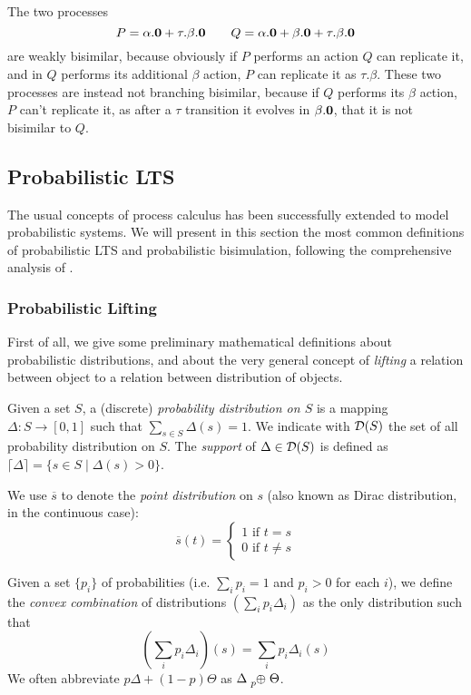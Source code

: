 The two processes \[P = \alpha.\mathbf{0} + \tau.\beta.\mathbf{0} \qquad Q = \alpha.\mathbf{0} + \beta.\mathbf{0} + \tau.\beta.\mathbf{0}\] are weakly bisimilar, because obviously if $P$ performs an action $Q$ can replicate it, and in $Q$ performs its additional $\beta$ action, $P$ can replicate it as $\tau.\beta$. These two processes are instead not branching bisimilar, because if $Q$ performs its $\beta$ action, $P$ can't replicate it, as after a $\tau$ transition it evolves in $\beta.\mathbf{0}$, that it is not bisimilar to $Q$.

\subsection{Probabilistic LTS} \label{pLTS}

The usual concepts of process calculus has been successfully extended to model probabilistic systems. We will present in this section the most common definitions of probabilistic LTS and probabilistic bisimulation, following the comprehensive analysis of \cite{hennessyExploringProbabilisticBisimulations2012, dengLogicalMetricAlgorithmic2011}.

\subsubsection{Probabilistic Lifting}
First of all, we give some preliminary mathematical definitions about probabilistic distributions, and about the very general concept of \textit{lifting} a relation between object to a relation between distribution of objects.

Given a set $S$, a (discrete) \textit{probability distribution on $S$} is a mapping $\Delta: S \rightarrow [0, 1]$ such that $\sum_{s\in S} \Delta(s) = 1$. We indicate with $\mathcal{D}(S)$ the set of all probability distribution on $S$.
The \textit{support} of $\Delta \in \mathcal{D}(S)$ is defined as $\lceil\Delta\rceil = \{s \in S \mid \Delta(s) > 0\}$.

We use $\overline{s}$ to denote the \textit{point distribution} on $s$ (also known as Dirac distribution, in the continuous case):
\[
	\overline{s}(t) = 
	\begin{cases} 1 \text{ if }t = s \\
	0 \text{ if } t\neq s
	\end{cases}
\]

Given a set $\{p_i\}$ of probabilities (i.e. $\sum_i p_i = 1$ and $p_i > 0$ for each $i$), we define the \textit{convex combination} of distributions $\left(\sum_i p_i \Delta_i\right)$ as the only 
distribution such that
\[
\left(\sum_i p_i \Delta_i\right)(s) = \sum_i p_i \Delta_i(s)
\]
We often abbreviate $p \Delta + (1-p) \Theta$ as $\Delta \psum{p} \Theta$.

